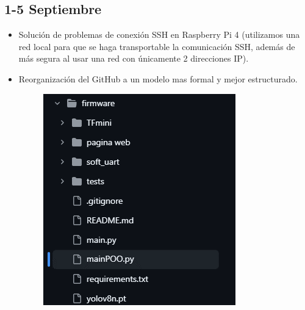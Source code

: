 \documentclass[12pt,a4paper]{article}
\begin{document}
\subsection*{1-5 Septiembre}
\begin{itemize}
\item Solución de problemas de conexión SSH en Raspberry Pi 4 (utilizamos una red local para que se haga transportable la comunicación SSH, además de más segura al usar una red con únicamente 2 direcciones IP).


\item Reorganización del GitHub a un modelo mas formal y mejor estructurado.

\begin{figure}[H]
    \centering
    \includegraphics[width=0.5\linewidth]{Carpeta de campo/Imagen23.png}
\end{figure}


\end{itemize}
\end{document}
